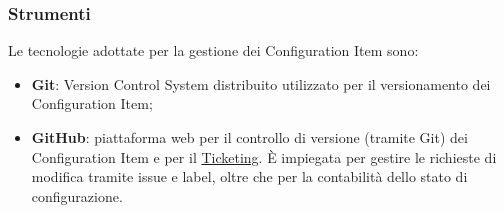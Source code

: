 \subsubsection{Strumenti}
Le tecnologie adottate per la gestione dei Configuration Item sono:
\begin{itemize}
    \item \textbf{Git}: Version Control System distribuito utilizzato per il versionamento dei Configuration Item;
    \item \textbf{GitHub}: piattaforma web per il controllo di versione (tramite Git) dei Configuration Item e per il \hyperlink{par:ticketing}{Ticketing}. È impiegata per gestire le richieste di modifica tramite issue e label, oltre che per la contabilità dello stato di configurazione.
\end{itemize}
